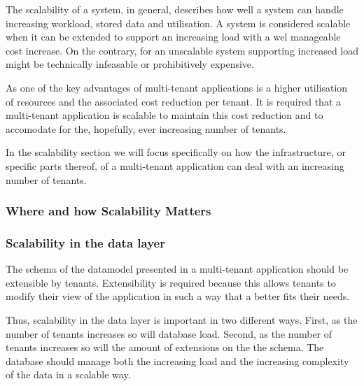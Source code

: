 The scalability of a system, in general, describes how well a system can handle increasing workload, stored data and utilisation.
A system is considered scalable when it can be extended to support an increasing load with a wel manageable cost increase.
On the contrary, for an unscalable system supporting increased load might be technically infeasable or prohibitively expensive.\cite{bondi2000scalability}

As one of the key advantages of multi-tenant applications is a higher utilisation of resources and the associated cost reduction per tenant.\cite{bezemer2010multi} 
It is required that a multi-tenant application is scalable to maintain this cost reduction and to accomodate for the, hopefully, ever increasing number of tenants.

In the scalability section we will focus specifically on how the infrastructure, or specific parts thereof, of a multi-tenant application can deal with an increasing number of tenants.

\subsubsection{Where and how Scalability Matters}


\subsubsection{Scalability in the data layer}
The schema of the datamodel presented in a multi-tenant application should be extensible by tenants.
Extensibility is required because this allows tenants to modify their view of the application in such a way that a better fits their needs.

Thus, scalability in the data layer is important in two different ways.
First, as the number of tenants increases so will database load.
Second, as the number of tenants increases so will the amount of extensions on the the schema. 
The database should manage both the increasing load and the increasing complexity of the data in a scalable way.


